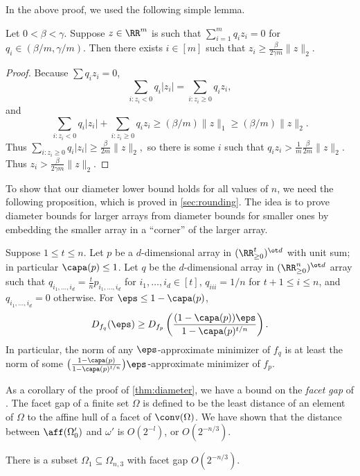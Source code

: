 In the above proof, we used the following simple lemma.
\begin{lem}\label{lem:simple} Let $0 < \beta < \gamma$. Suppose $z \in \RR^m$ is such that $\sum_{i = 1}^m q_i z_i = 0$ for $q_i \in (\beta/m, \gamma/m)$. Then there exists $i \in [m]$ such that $z_i \geq \frac{\beta }{2\gamma m} \|z\|_2$.
\end{lem}
\begin{proof}
Because $\sum q_i z_i = 0$, 
$$ \sum_{i: z_i < 0} q_i |z_i| = \sum_{i:z_i \geq 0} q_i z_i,$$
and 
$$ \sum_{i: z_i < 0} q_i |z_i| +  \sum_{i:z_i \geq 0} q_i z_i \geq (\beta/m) \|z\|_1 \geq (\beta/m)\|z\|_2.$$
Thus $\sum_{i: z_i \geq 0} q_i |z_i| \geq \frac{\beta}{2m}\|z\|_2,$ so there is some $i$ such that $q_i z_i > \frac{1}{m} \frac{\beta}{2m}\|z\|_2$. Thus $z_i > \frac{\beta}{2\gamma m}\|z\|_2$.
\end{proof}
To show that our diameter lower bound holds for all values of $n$, we need the following proposition, which is proved in \cref{sec:rounding}. The idea is to prove diameter bounds for larger arrays from diameter bounds for smaller ones by embedding the smaller array in a ``corner'' of the larger array.

\begin{prp} \label{prp:pad-diameter}
Suppose $1 \leq t \leq n$. Let $p$ be a $d$-dimensional array in $(\RR_{\geq 0}^t)^{\ot d}$ with unit sum; in particular $\capa(p) \leq 1$. Let $q$ be the $d$-dimensional array in $(\RR_{\geq 0}^n)^{\ot d}$ array such that $q_{i_1, \dots, i_d} = \frac{t}{n} p_{i_1, \dots, i_d}$ for $i_1, \dots, i_d \in [t]$, $q_{iii} = 1/n$ for $t+1 \leq i \leq n$, and $q_{i_1, \dots, i_d} = 0$ otherwise. For $\eps \leq 1 - \capa(p)$, 
$$D_{f_q}(\eps) \geq D_{f_p}\left(\frac{(1 - \capa(p))\eps}{1 - \capa(p)^{t/n}}\right).$$ 
In particular, the norm of any $\eps$-approximate minimizer of $f_q$ is at least the norm of some $\big( \frac{1 - \capa(p)}{1 - \capa(p)^{t/n}} \big) \eps$-approximate minimizer of $f_p$. 
\end{prp}



As a corollary of the proof of \cref{thm:diameter}, we have a bound on the \emph{facet gap} of \cite{burgisser2020interior}. The facet gap of a finite set $\Omega$ is defined to be the least distance of an element of $\Omega$ to the affine hull of a facet of $\conv(\Omega)$. We have shown that the distance between $\aff(\Omega_0')$ and $\omega'$ is $O(2^{-l})$, or $O(2^{- n/3})$. 
\begin{cor} \label{cor:facet-fap}
There is a subset $\Omega_1 \subseteq \Omega_{n,3}$ with facet gap $O(2^{- n/3})$.
\end{cor}

